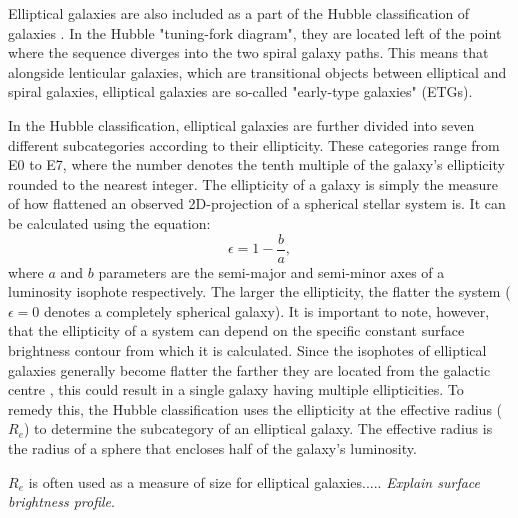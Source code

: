 \documentclass[english, oneside]{HYgradu}
\begin{document}
Elliptical galaxies are also included as a part of the Hubble classification of galaxies \citep{Hubble1926}. In the Hubble "tuning-fork diagram", they are located left of the point where the sequence diverges into the two spiral galaxy paths. This means that alongside lenticular galaxies, which are transitional objects between elliptical and spiral galaxies, elliptical galaxies are so-called "early-type galaxies" (ETGs).

In the Hubble classification, elliptical galaxies are further divided into seven different subcategories according to their ellipticity. These categories range from E0 to E7, where the number denotes the tenth multiple of the galaxy's ellipticity rounded to the nearest integer. The ellipticity of a galaxy is simply the measure of how flattened an observed 2D-projection of a spherical stellar system is. It can be calculated using the equation:
\begin{equation}
\epsilon = 1 - \frac{b}{a},
\end{equation}
where $a$ and $b$ parameters are the semi-major and semi-minor axes of a luminosity isophote respectively. The larger the ellipticity, the flatter the system ($\epsilon = 0$ denotes a completely spherical galaxy). It is important to note, however, that the ellipticity of a system can depend on the specific constant surface brightness contour from which it is calculated. Since the isophotes of elliptical galaxies generally become flatter the farther they are located from the galactic centre \citep{BinneyTremaine}, this could result in a single galaxy having multiple ellipticities. To remedy this, the Hubble classification uses the ellipticity at the effective radius ($R_e$) to determine the subcategory of an elliptical galaxy. The effective radius is the radius of a sphere that encloses half of the galaxy's luminosity.

$R_e$ is often used as a measure of size for elliptical galaxies..... \textit{Explain surface brightness profile}.
\end{document}
